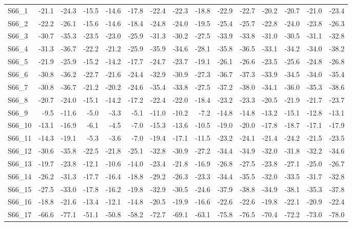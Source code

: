 \begin{longtable}{lrrrrrrrrrrrrrr}
S66\_1 & -21.1 & -24.3 & -15.5 & -14.6 & -17.8 & -22.4 & -22.3 & -18.8 & -22.9 & -22.7 & -20.2 & -20.7 & -21.0 & -23.4 \\
S66\_2 & -22.2 & -26.1 & -15.6 & -14.6 & -18.4 & -24.8 & -24.0 & -19.5 & -25.4 & -25.7 & -22.8 & -24.0 & -23.8 & -26.3 \\
S66\_3 & -30.7 & -35.3 & -23.5 & -23.0 & -25.9 & -31.3 & -30.2 & -27.5 & -33.9 & -33.8 & -31.0 & -30.5 & -31.1 & -32.8 \\
S66\_4 & -31.3 & -36.7 & -22.2 & -21.2 & -25.9 & -35.9 & -34.6 & -28.1 & -35.8 & -36.5 & -33.1 & -34.2 & -34.0 & -38.2 \\
S66\_5 & -21.9 & -25.9 & -15.2 & -14.2 & -17.7 & -24.7 & -23.7 & -19.1 & -26.1 & -26.6 & -23.5 & -25.6 & -24.8 & -26.8 \\
S66\_6 & -30.8 & -36.2 & -22.7 & -21.6 & -24.4 & -32.9 & -30.9 & -27.3 & -36.7 & -37.3 & -33.9 & -34.5 & -34.0 & -35.4 \\
S66\_7 & -30.8 & -36.7 & -21.2 & -20.2 & -24.6 & -35.4 & -33.8 & -27.5 & -37.2 & -38.0 & -34.1 & -36.0 & -35.3 & -38.6 \\
S66\_8 & -20.7 & -24.0 & -15.1 & -14.2 & -17.2 & -22.4 & -22.0 & -18.4 & -23.2 & -23.3 & -20.5 & -21.9 & -21.7 & -23.7 \\
S66\_9 & -9.5 & -11.6 & -5.0 & -3.3 & -5.1 & -11.0 & -10.2 & -7.2 & -14.8 & -14.8 & -13.2 & -15.1 & -12.8 & -13.1 \\
S66\_10 & -13.1 & -16.9 & -6.1 & -4.5 & -7.0 & -15.3 & -13.6 & -10.5 & -19.0 & -20.0 & -17.8 & -18.7 & -17.1 & -17.9 \\
S66\_11 & -14.3 & -19.1 & -5.3 & -3.6 & -7.0 & -19.4 & -17.1 & -11.5 & -23.2 & -24.1 & -21.4 & -24.2 & -21.5 & -23.5 \\
S66\_12 & -30.6 & -35.8 & -22.5 & -21.8 & -25.1 & -32.8 & -30.9 & -27.2 & -34.4 & -34.9 & -32.0 & -31.8 & -32.2 & -34.6 \\
S66\_13 & -19.7 & -23.8 & -12.1 & -10.6 & -14.0 & -23.4 & -21.8 & -16.9 & -26.8 & -27.5 & -23.8 & -27.1 & -25.0 & -26.7 \\
S66\_14 & -26.2 & -31.3 & -17.7 & -16.4 & -18.8 & -29.2 & -26.3 & -23.3 & -34.4 & -35.5 & -32.0 & -33.5 & -31.7 & -32.8 \\
S66\_15 & -27.5 & -33.0 & -17.8 & -16.2 & -19.8 & -32.9 & -30.5 & -24.6 & -37.9 & -38.8 & -34.9 & -38.1 & -35.3 & -37.8 \\
S66\_16 & -18.8 & -21.6 & -13.4 & -12.1 & -14.8 & -20.5 & -19.9 & -16.6 & -22.6 & -22.6 & -19.8 & -22.1 & -20.9 & -22.4 \\
S66\_17 & -66.6 & -77.1 & -51.1 & -50.8 & -58.2 & -72.7 & -69.1 & -63.1 & -75.8 & -76.5 & -70.4 & -72.2 & -73.0 & -78.0 \\

\end{longtable}
